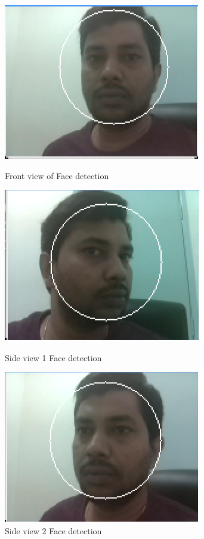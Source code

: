 \documentclass[sigconf]{acmart}
\begin{document}
\begin{figure}[htb]
  \includegraphics[width=0.8\columnwidth]{images/Face-detect-frontview.png}
  \caption{Front view of Face detection}\label{F:frontview}

  \includegraphics[width=0.8\columnwidth]{images/Face-detect-sideview1.png}
  \caption{Side view 1 Face detection}\label{F:sideview1}

  \includegraphics[width=0.8\columnwidth]{images/Face-detect-sideview2.png}
  \caption{Side view 2 Face detection}\label{F:sideview2}
\end{figure}
\end{document}
